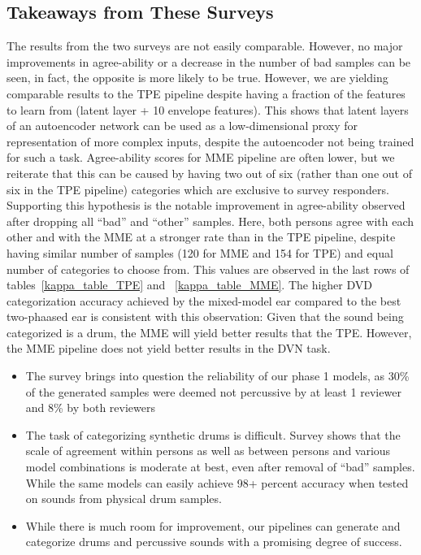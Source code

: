 \documentclass[runningheads,a4paper]{llncs}
\begin{document}
\subsection{Takeaways from These Surveys}
\label{survey2_takeaway}
The results from the two surveys are not easily comparable. However, no major improvements in agree-ability or a decrease in the number of bad samples can be seen, in fact, the opposite is more likely to be true. However, we are yielding comparable results to the TPE pipeline despite having a fraction of the features to learn from (latent layer + 10 envelope features). This shows that latent layers of an autoencoder network can be used as a low-dimensional proxy for representation of more complex inputs, despite the autoencoder not being trained for such a task. Agree-ability scores for MME pipeline are often lower, but we reiterate that this can be caused by having two out of six (rather than one out of six in the TPE pipeline) categories which are exclusive to survey responders. Supporting this hypothesis is the notable improvement in agree-ability observed after dropping all \enquote{bad} and \enquote{other} samples. Here, both persons agree with each other and with the MME at a stronger rate than in the TPE pipeline, despite having similar number of samples (120 for MME and 154 for TPE) and equal number of categories to choose from. This values are observed in the last rows of tables~\ref{kappa_table_TPE} and ~\ref{kappa_table_MME}. The higher DVD categorization accuracy achieved by the mixed-model ear compared to the best two-phaased ear is consistent with this observation: Given that the sound being categorized is a drum, the MME will yield better results that the TPE. However, the MME pipeline does not yield better results in the DVN task. 
\begin{itemize}
    \item The survey brings into question the reliability of our phase 1 models, as 30\% of the generated samples were deemed not percussive by at least 1 reviewer and 8\% by both reviewers
    \item The task of categorizing synthetic drums is difficult. Survey shows that the scale of agreement within persons as well as between persons and various model combinations is moderate at best, even after removal of \enquote{bad} samples.  While the same models can easily achieve 98+ percent accuracy when tested on sounds from physical drum samples. 
    \item While there is much room for improvement, our pipelines can generate and categorize drums and percussive sounds with a promising degree of success. 
\end{itemize}


\end{document}
